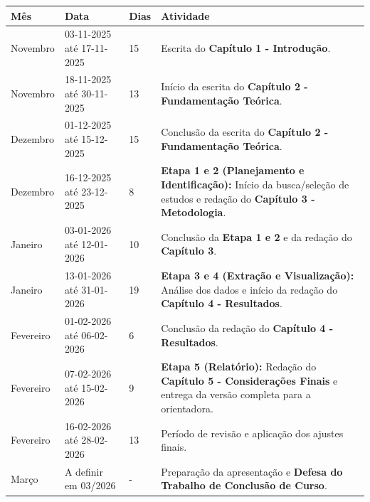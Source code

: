 \documentclass[
    12pt,               %
    openright,          %
    oneside,            %
    a4paper,            %
    chapter=TITLE,      %
    sumario=tradicional,%
    english,            %
    brazilian,          %
 ]{abntex2}
\begin{document}
\begin{quadro}[!ht]
    \centering
    \caption{Cronograma de execução da pesquisa.}
    \label{qua:cronograma}
    
    \begin{tabular}{|p{2.2cm}|l|p{1.2cm}|p{7cm}|} \hline
        \textbf{Mês} & \textbf{Data} & \textbf{Dias} & \textbf{Atividade} \\ \hline
        Novembro & 03-11-2025 até 17-11-2025 & 15 & Escrita do \textbf{Capítulo 1 - Introdução}. \\ \hline
        Novembro & 18-11-2025 até 30-11-2025 & 13 & Início da escrita do \textbf{Capítulo 2 - Fundamentação Teórica}. \\ \hline
        Dezembro & 01-12-2025 até 15-12-2025 & 15 & Conclusão da escrita do \textbf{Capítulo 2 - Fundamentação Teórica}. \\ \hline
        Dezembro & 16-12-2025 até 23-12-2025 & 8 & \textbf{Etapa 1 e 2 (Planejamento e Identificação):} Início da busca/seleção de estudos e redação do \textbf{Capítulo 3 - Metodologia}. \\ \hline
        Janeiro & 03-01-2026 até 12-01-2026 & 10 & Conclusão da \textbf{Etapa 1 e 2} e da redação do \textbf{Capítulo 3}. \\ \hline
        Janeiro & 13-01-2026 até 31-01-2026 & 19 & \textbf{Etapa 3 e 4 (Extração e Visualização):} Análise dos dados e início da redação do \textbf{Capítulo 4 - Resultados}. \\ \hline
        Fevereiro & 01-02-2026 até 06-02-2026 & 6 & Conclusão da redação do \textbf{Capítulo 4 - Resultados}. \\ \hline
        Fevereiro & 07-02-2026 até 15-02-2026 & 9 & \textbf{Etapa 5 (Relatório):} Redação do \textbf{Capítulo 5 - Considerações Finais} e entrega da versão completa para a orientadora. \\ \hline
        Fevereiro & 16-02-2026 até 28-02-2026 & 13 & Período de revisão e aplicação dos ajustes finais. \\ \hline
        Março & A definir em 03/2026 & - & Preparação da apresentação e \textbf{Defesa do Trabalho de Conclusão de Curso}. \\ \hline
    \end{tabular}
    
\end{quadro}


\postextual
\end{document}
